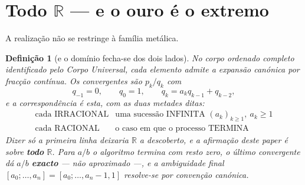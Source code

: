 \documentclass[11pt,a4paper]{article}
\newtheorem{definicao}{Definição}
\begin{document}
\section{Todo $\mathbb{R}$ --- e o ouro é o extremo}\label{sec:todos}

A realização não se restringe à família metálica.

\begin{definicao}[e o domínio fecha-se dos dois lados]\label{def:real}
No corpo ordenado completo identificado pelo \emph{Corpo Universal}, cada
elemento admite a expansão canónica por fracção contínua. Os convergentes são
$p_k/q_k$ com
\[
q_{-1}=0,\qquad q_0=1,\qquad q_k=a_kq_{k-1}+q_{k-2},
\]
e a correspondência é esta, com as duas metades ditas:
\[
\boxed{
\begin{array}{ll}
\text{cada IRRACIONAL} & \text{uma sucessão INFINITA }(a_k)_{k\geq1},\ a_k\geq1\\[2pt]
\text{cada RACIONAL}   & \text{o caso em que o processo TERMINA}
\end{array}}
\]
Dizer só a primeira linha deixaria $\mathbb{R}$ a descoberto, e a afirmação
deste paper é sobre \textbf{todo} $\mathbb{R}$. Para $a/b$ o algoritmo termina com
resto zero, o último convergente dá $a/b$ \textbf{exacto} --- não aproximado
---, e a ambiguidade final $[a_0;\ldots,a_n]=[a_0;\ldots,a_n{-}1,1]$ resolve-se
por convenção canónica.
\end{definicao}
\end{document}

